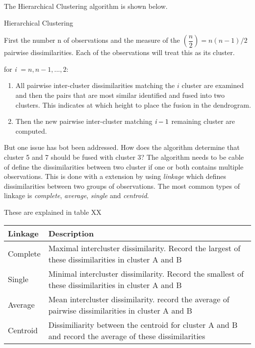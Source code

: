 The Hierarchical Clustering algorithm is shown below.

\begin{algorithm}
	\caption{Hierarchical Clustering}
	\label{algo:HierarchicalClustering}
	\begin{algorithmic}[1]
 		\State First the number n of observations and the measure of the $(\dfrac{n}{2}) =n(n-1)/2 $ pairwise dissimilarities. Each of the observations will treat this as its cluster.
 		
 		\State for \emph{i} $= n,n-1,...,2:$
 		\begin{enumerate}[label=(\alph*)]
 			\item All pairwise inter-cluster dissimilarities matching the $i$ cluster are examined and then the pairs that are most similar identified and fused into two clusters. This indicates at which height to place the fusion in the dendrogram.
 			\item Then the new pairwise inter-cluster matching $\emph{i}-1$ remaining cluster are computed.
 		\end{enumerate}
 	\end{algorithmic}
 \end{algorithm}

But one issue has bot been addressed. How does the algorithm determine that cluster 5 and 7 should be fused with cluster 3? The algorithm needs to be cable of define the dissimilarities between two cluster if one or both contains multiple observations. This is done with a extension by using \emph{linkage} which defines dissimilarities between two groups of observations. The most common types of linkage is \emph{complete}, \emph{average}, \emph{single} and
\emph{centroid}.

These are explained in table XX
\begin{center}
	\begin{tabular}{ | l | p{12cm} |}
		\hline
		Linkage & Description \\ \hline
		Complete & Maximal intercluster dissimilarity. Record the largest of these dissimilarities in cluster A and B \\ \hline
		Single & Minimal intercluster dissimilarity. Record the smallest of these dissimilarities in cluster A and B \\ \hline
		Average & Mean intercluster dissimilarity. record the average of pairwise dissimilarities in cluster A and B\\
		\hline
		Centroid & Dissimiliarity between the centroid for cluster A and B and record the average of these dissimilarities
		\\
		\hline
	\end{tabular}
\end{center}

